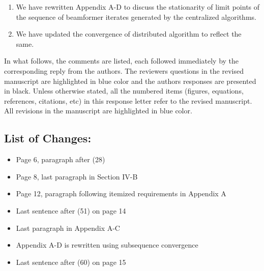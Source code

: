 \begin{enumerate}
	\item We have rewritten Appendix A-D to discuss the stationarity of limit points of the sequence of beamformer iterates generated by the centralized algorithms.
	\item We have updated the convergence of distributed algorithm to reflect the same.
\end{enumerate}

In what follows, the comments are listed, each followed immediately by the corresponding reply from the authors. The reviewers questions in the revised manuscript are highlighted in blue color and the authors responses are presented in black. Unless otherwise stated, all the numbered items (figures, equations, references, citations, etc) in this response letter refer to the revised manuscript. All revisions in the manuscript are highlighted in blue color.

\subsection*{List of Changes:}
\vspace*{1eM}
\begin{itemize}
	\item Page 6, paragraph after (28)
	\item Page 8, last paragraph in Section IV-B
	\item Page 12, paragraph following itemized requirements in Appendix A
	\item Last sentence after (51) on page 14
	\item Last paragraph in Appendix A-C
	\item Appendix A-D is rewritten using subsequence convergence
	\item Last sentence after (60) on page 15
\end{itemize}